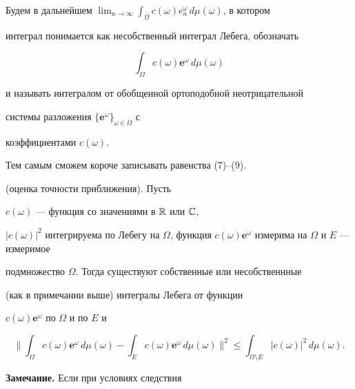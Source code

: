 \begin{defn}\hspace{-1.8mm}{\bf.}


Будем в дальнейшем $\lim_{n\to\infty}


\int_\Omega c(\omega)e_n^\omega\,d\mu(\omega)$, в котором


интеграл понимается как несобственный интеграл Лебега, обозначать


$$


\int_\Omega c(\omega)\boldsymbol e^\omega\,d\mu(\omega)


$$


и называть интегралом от обобщенной ортоподобной неотрицательной


системы разложения $\{\boldsymbol e^\omega\}_{\omega\in\Omega}$ с


коэффициентами $c(\omega)$.


Тем самым сможем короче записывать равенства (7)--(9).


\end{defn}





\begin{cor} (оценка точности приближения). Пусть


$c(\omega)$ --- функция со значениями в $\Bbb R$ или $\Bbb C$,


$|c(\omega)|^2$ интегрируема по Лебегу на $\Omega$, функция $c(\omega)


\boldsymbol e^\omega$ измерима на $\Omega$ и $E$ --- измеримое


подмножество $\Omega$. Тогда существуют собственные или несобственнные


(как в примечании выше) интегралы Лебега от функции


$c(\omega)\boldsymbol e^\omega$ по $\Omega$ и по $E$ и


$$


\bigg\| \int_\Omega c(\omega)\boldsymbol e^\omega\,d\mu(\omega)-


\int_E c(\omega)\boldsymbol e^\omega\,d\mu(\omega)\bigg\|^2\leqslant


\int_{\Omega\setminus E}|c(\omega)|^2\,d\mu(\omega).


$$


\end{cor}





{\bf Замечание.} Если при условиях следствия


